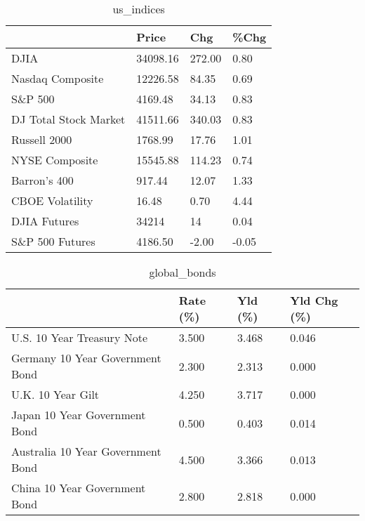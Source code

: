 \documentclass{article}%
\begin{document}
%


\begin{table}[htbp]%
\caption{us\_indices}%
\centering%
\begin{adjustbox}{width=1\textwidth}%
\begin{tabular}{llll}
\toprule
                      &    Price &    Chg &  \%Chg \\
\midrule
                 DJIA & 34098.16 & 272.00 &  0.80 \\
     Nasdaq Composite & 12226.58 &  84.35 &  0.69 \\
              S\&P 500 &  4169.48 &  34.13 &  0.83 \\
DJ Total Stock Market & 41511.66 & 340.03 &  0.83 \\
         Russell 2000 &  1768.99 &  17.76 &  1.01 \\
       NYSE Composite & 15545.88 & 114.23 &  0.74 \\
         Barron's 400 &   917.44 &  12.07 &  1.33 \\
      CBOE Volatility &    16.48 &   0.70 &  4.44 \\
         DJIA Futures &    34214 &     14 &  0.04 \\
      S\&P 500 Futures &  4186.50 &  -2.00 & -0.05 \\
\bottomrule
\end{tabular}
%
\end{adjustbox}%
\end{table}

%


\begin{table}[htbp]%
\caption{global\_bonds}%
\centering%
\begin{adjustbox}{width=1\textwidth}%
\begin{tabular}{llll}
\toprule
                                  & Rate (\%) & Yld (\%) & Yld Chg (\%) \\
\midrule
       U.S. 10 Year Treasury Note &    3.500 &   3.468 &       0.046 \\
  Germany 10 Year Government Bond &    2.300 &   2.313 &       0.000 \\
                U.K. 10 Year Gilt &    4.250 &   3.717 &       0.000 \\
    Japan 10 Year Government Bond &    0.500 &   0.403 &       0.014 \\
Australia 10 Year Government Bond &    4.500 &   3.366 &       0.013 \\
    China 10 Year Government Bond &    2.800 &   2.818 &       0.000 \\
\bottomrule
\end{tabular}
%
\end{adjustbox}%
\end{table}
\end{document}
